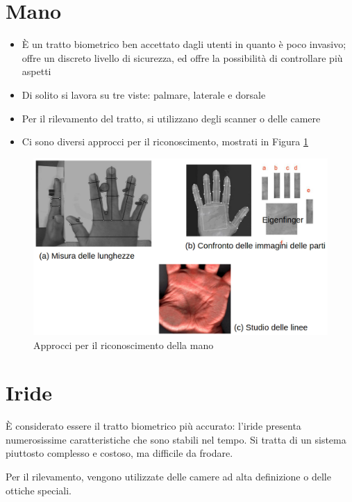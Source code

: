 \documentclass{report}
\begin{document}
\section{Mano}

\begin{itemize}
    \item È un tratto biometrico ben accettato dagli utenti in quanto è poco invasivo; offre un discreto livello di sicurezza, ed offre la possibilità di controllare più aspetti
    \item Di solito si lavora su tre viste: palmare, laterale e dorsale
    \item Per il rilevamento del tratto, si utilizzano degli scanner o delle camere
    \item Ci sono diversi approcci per il riconoscimento, mostrati in Figura \ref{fig:mano}
\end{itemize}


\begin{figure}
    \centering
    \includegraphics[width=1\linewidth]{images/mano.png}
    \caption{Approcci per il riconoscimento della mano}
    \label{fig:mano}
\end{figure}

\newpage

\section{Iride}

È considerato essere il tratto biometrico più accurato: l'iride presenta numerosissime caratteristiche che sono stabili nel tempo. Si tratta di un sistema piuttosto complesso e costoso, ma difficile da frodare.

\noindent Per il rilevamento, vengono utilizzate delle camere ad alta definizione o delle ottiche speciali.
\end{document}
